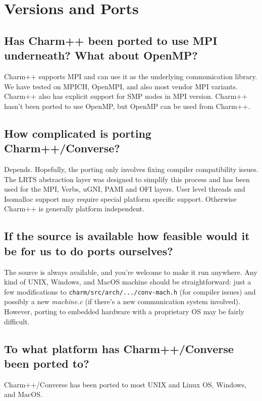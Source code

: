 \section{Versions and Ports}

\subsection{Has Charm++ been ported to use MPI underneath? What about OpenMP?}

Charm++ supports MPI and can use it as the underlying communication
library. We have tested on MPICH, OpenMPI, and also most vendor MPI
variants.  Charm++ also has explicit support for SMP nodes in MPI
version. Charm++ hasn't been ported to use OpenMP, but OpenMP can be
used from Charm++.

\subsection{How complicated is porting Charm++/Converse?}

Depends. Hopefully, the porting only involves fixing compiler compatibility
issues.  The LRTS abstraction layer was designed to simplify this process and has been used for the
MPI, Verbs, uGNI, PAMI and OFI layers.  User level threads and Isomalloc support may require special
platform specific support.  Otherwise Charm++ is generally platform independent.

\subsection{If the source is available how feasible would it be for us to do ports
ourselves?}

The source is always available, and you're welcome to make it run anywhere.
Any kind of UNIX, Windows, and MacOS machine should be straightforward: just a
few modifications to {\tt charm/src/arch/.../conv-mach.h} (for compiler
issues) and possibly
a new {\em machine.c} (if there's a new communication system involved).
However, porting to embedded hardware with a proprietary OS may be fairly difficult.

\subsection{To what platform has Charm++/Converse been ported to?}

Charm++/Converse has been ported to most UNIX and Linux OS, Windows, and MacOS.

